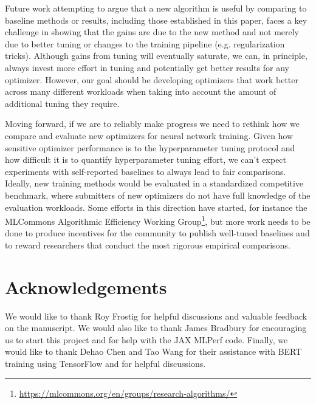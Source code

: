 \documentclass{article}
\begin{document}
Future work attempting to argue that a new algorithm is useful by comparing to baseline methods or results, including those established in this paper, faces a key challenge in showing that the gains are due to the new method and not merely due to better tuning or changes to the training pipeline (e.g. regularization tricks).
Although gains from tuning will eventually saturate, we can, in principle, always invest more effort in tuning and potentially get better results for any optimizer. However, our goal should be developing optimizers that work better across many different workloads when taking into account the amount of additional tuning they require.

Moving forward, if we are to reliably make progress we need to rethink how we compare and evaluate new optimizers for neural network training. Given how sensitive optimizer performance is to the hyperparameter tuning protocol and how difficult it is to quantify hyperparameter tuning effort, we can't expect experiments with self-reported baselines to always lead to fair comparisons. Ideally, new training methods would be evaluated in a standardized competitive benchmark, where submitters of new optimizers do not have full knowledge of the evaluation workloads. Some efforts in this direction have started, for instance the MLCommons Algorithmic Efficiency Working Group\footnote{\url{https://mlcommons.org/en/groups/research-algorithms/}}, but more work needs to be done to produce incentives for the community to publish well-tuned baselines and to reward researchers that conduct the most rigorous empirical comparisons.











 \section*{Acknowledgements}
We would like to thank Roy Frostig for helpful discussions and valuable feedback on the manuscript. We would also like to thank James Bradbury for encouraging us to start this project and for help with the JAX MLPerf code.
Finally, we would like to thank Dehao Chen and Tao Wang for their assistance with BERT training using TensorFlow and for helpful discussions.




\end{document}
